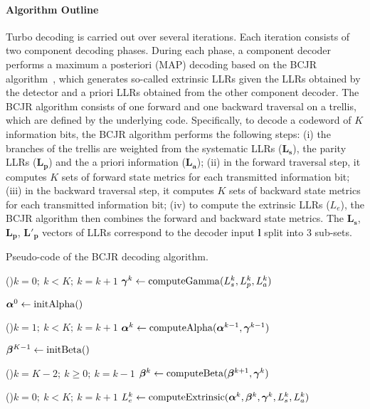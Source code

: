 \paragraph{Algorithm Outline}

Turbo decoding is carried out over several iterations. Each iteration
consists of two component decoding phases. During each phase, a component
decoder performs a maximum a posteriori (MAP) decoding based on the BCJR
algorithm~\cite{Bahl1974}, which generates so-called extrinsic LLRs given the
LLRs obtained by the detector and a priori LLRs obtained from the other
component decoder. The BCJR algorithm consists of one forward and one backward
traversal on a trellis, which are defined by the underlying code. Specifically,
to decode a codeword of $K$ information bits, the BCJR algorithm performs the
following steps: (i) the branches of the trellis are weighted from the
systematic LLRs ($\bm{L_s}$), the parity LLRs ($\bm{L_p}$) and the a priori
information ($\bm{L_a}$); (ii) in the forward traversal step, it computes $K$
sets of forward state metrics for each transmitted information bit; (iii) in the
backward traversal step, it computes $K$ sets of backward state metrics for each
transmitted information bit; (iv) to compute the extrinsic LLRs ($L_e$), the
BCJR algorithm then combines the forward and backward state metrics. The
$\bm{L_s}$, $\bm{L_p}$, $\bm{L'_p}$ vectors of LLRs correspond to the decoder
input $\bm{l}$ split into 3 sub-sets.

\begin{algorithm}
  \caption{Pseudo-code of the BCJR decoding algorithm.}
  \label{alg:ctx_turbo_bcjr}

    \For(){$k=0;~k<K;~k=k+1$}
    {
      $\boldsymbol{\gamma}^k\gets \operatorname*{computeGamma}(L_{s}^k, L_{p}^k, L_{a}^k)$
    }

    $\boldsymbol{\alpha}^0\gets \operatorname*{initAlpha}()$

    \For(){$k=1;~k<K;~k=k+1$}
    {
      $\boldsymbol{\alpha}^k\gets \operatorname*{computeAlpha}(\boldsymbol{\alpha}^{k-1}, \boldsymbol{\gamma}^{k-1})$
    }

    $\boldsymbol{\beta}^{K-1}\gets \operatorname*{initBeta}()$

    \For(){$k=K-2;~k \geq 0;~k=k-1$}
    {
      $\boldsymbol{\beta}^k\gets \operatorname*{computeBeta}(\boldsymbol{\beta}^{k+1}, \boldsymbol{\gamma}^{k})$
    }

    \For(){$k=0;~k<K;~k=k+1$}
    {
      $L_e^k\gets \operatorname*{computeExtrinsic}(\boldsymbol{\alpha}^k, \boldsymbol{\beta}^{k}, \boldsymbol{\gamma}^{k}, L_{s}^k, L_{a}^k)$
    }
\end{algorithm}

